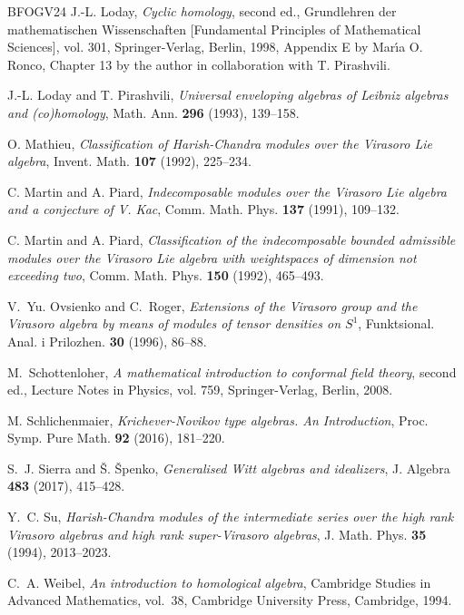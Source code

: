 \documentclass[11pt, svgnames]{amsart}
\theoremstyle{definition}
\begin{document}
\begin{thebibliography}{BFOGV24}
J.-L. Loday, \emph{Cyclic homology}, second ed., Grundlehren der
  mathematischen Wissenschaften [Fundamental Principles of Mathematical
  Sciences], vol. 301, Springer-Verlag, Berlin, 1998, Appendix E by Mar\'{\i}a
  O. Ronco, Chapter 13 by the author in collaboration with T. Pirashvili.

J.-L. Loday and T. Pirashvili, \emph{Universal enveloping algebras
  of {L}eibniz algebras and (co)homology}, Math. Ann. \textbf{296} (1993), 139--158.

O. Mathieu, \emph{Classification of {H}arish-{C}handra modules over the
  {V}irasoro {L}ie algebra}, Invent. Math. \textbf{107} (1992),
  225--234.

C. Martin and A. Piard, \emph{Indecomposable modules over the
  {V}irasoro {L}ie algebra and a conjecture of {V}. {K}ac}, Comm. Math. Phys.
  \textbf{137} (1991), 109--132.

C. Martin and A. Piard, \emph{Classification of the indecomposable bounded admissible modules
  over the {V}irasoro {L}ie algebra with weightspaces of dimension not
  exceeding two}, Comm. Math. Phys. \textbf{150} (1992), 465--493.

V.~Yu. Ovsienko and C.~Roger, \emph{Extensions of the {V}irasoro group and the
  {V}irasoro algebra by means of modules of tensor densities on {$S^1$}},
  Funktsional. Anal. i Prilozhen. \textbf{30} (1996), 86--88.

M.~Schottenloher, \emph{A mathematical introduction to conformal field theory},
  second ed., Lecture Notes in Physics, vol. 759, Springer-Verlag, Berlin,
  2008.

M. Schlichenmaier, \emph{{Krichever-Novikov type algebras. An
  Introduction}}, Proc. Symp. Pure Math. \textbf{92} (2016), 181--220.

S.~J. Sierra and \v{S}. {\v S}penko, \emph{Generalised {W}itt algebras
  and idealizers}, J. Algebra \textbf{483} (2017), 415--428.

Y.~C. Su, \emph{Harish-{C}handra modules of the intermediate series over the
  high rank {V}irasoro algebras and high rank super-{V}irasoro algebras}, J.
  Math. Phys. \textbf{35} (1994), 2013--2023.

C.~A. Weibel, \emph{An introduction to homological algebra}, Cambridge
  Studies in Advanced Mathematics, vol.~38, Cambridge University Press,
  Cambridge, 1994.

\end{thebibliography}
\end{document}
